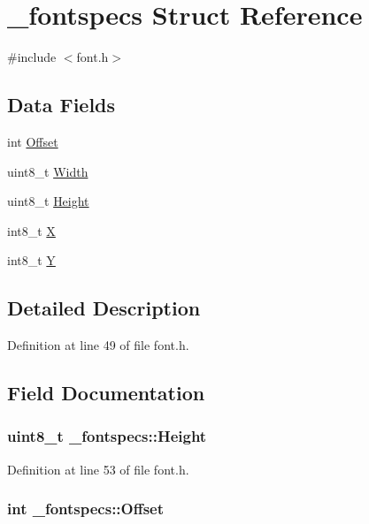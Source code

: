 \hypertarget{struct__fontspecs}{\section{\-\_\-fontspecs Struct Reference}
\label{struct__fontspecs}
}


{\ttfamily \#include $<$font.\-h$>$}

\subsection*{Data Fields}
\begin{DoxyCompactItemize}
\item 
int \hyperlink{struct__fontspecs_ad4ef5755b58ecd3bbc9894cee258091e}{Offset}
\item 
uint8\-\_\-t \hyperlink{struct__fontspecs_a8404888a24a2b065d91c4424e1907439}{Width}
\item 
uint8\-\_\-t \hyperlink{struct__fontspecs_a33e92e50bd86f34db768e027e4736089}{Height}
\item 
int8\-\_\-t \hyperlink{struct__fontspecs_a7273a891c79308389718266cb0b66f56}{X}
\item 
int8\-\_\-t \hyperlink{struct__fontspecs_a9771541eab33755d22c804f3bedf8682}{Y}
\end{DoxyCompactItemize}


\subsection{Detailed Description}


Definition at line 49 of file font.\-h.



\subsection{Field Documentation}
\hypertarget{struct__fontspecs_a33e92e50bd86f34db768e027e4736089}{
\subsubsection[{Height}]{\setlength{\rightskip}{0pt plus 5cm}uint8\-\_\-t \-\_\-fontspecs\-::\-Height}}\label{struct__fontspecs_a33e92e50bd86f34db768e027e4736089}


Definition at line 53 of file font.\-h.

\hypertarget{struct__fontspecs_ad4ef5755b58ecd3bbc9894cee258091e}{
\subsubsection[{Offset}]{\setlength{\rightskip}{0pt plus 5cm}int \-\_\-fontspecs\-::\-Offset}}\label{struct__fontspecs_ad4ef5755b58ecd3bbc9894cee258091e}


